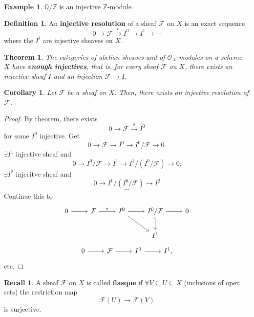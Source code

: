 \documentclass[12pt]{article}
\newtheorem*{theorem}{Theorem}
\newtheorem*{corollary}{Corollary}
\theoremstyle{definition}
\newtheorem*{definition}{Definition}
\newtheorem*{recall}{Recall}
\newtheorem*{example}{Example}
\begin{document}
\begin{example}
$\mathbb{Q}/\mathbb{Z}$ is an injective $\mathbb{Z}$-module.
\end{example}

\begin{definition}
An \textbf{injective resolution} of a sheaf $\mathcal{F}$ on $X$ is an exact sequence
\[0\longrightarrow\mathcal{F}\overset{\epsilon}{\longrightarrow}I^0\longrightarrow I^1\longrightarrow\cdots\]
where the $I^i$ are injective sheaves on $X$.
\end{definition}

\begin{theorem}
The categories of abelian sheaves and of $\mathcal{O}_X$-modules on a scheme $X$ have \textbf{enough injectives}, that is, for every sheaf $\mathcal{F}$ on $X$, there exists an injective sheaf $I$ and an injection $\mathcal{F}\rightarrow I$.
\end{theorem}

\begin{corollary}
Let $\mathcal{F}$ be a sheaf on $X$. Then, there exists an injective resolution of $\mathcal{F}$.
\end{corollary}

\begin{proof}
By theorem, there exists
\[0\longrightarrow\mathcal{F}\overset{\epsilon}{\longrightarrow}I^0\]
for some $I^0$ injective. Get
\[0\longrightarrow\mathcal{F}\longrightarrow I^0\longrightarrow I^0/\mathcal{F}\longrightarrow0.\]
$\exists I^1$ injective sheaf and
\[0\longrightarrow I^0/\mathcal{F}\longrightarrow I^1\longrightarrow I^1/(I^0/\mathcal{F})\longrightarrow0.\]
$\exists I^2$ injecitve sheaf and
\[0\longrightarrow I^1/(I^0/\mathcal{F})\longrightarrow I^2\]
\[\cdots\]
Continue this to
\[
\begin{tikzcd}
0\arrow[r]&\mathcal{F}\arrow[r,"\epsilon"]&I^0\arrow[r]\arrow[rd]&I^0/\mathcal{F}\arrow[r]\arrow[d,hook']&0\\
&&&I^1
\end{tikzcd}
\]
\[
\begin{tikzcd}
0\arrow[r]&\mathcal{F}\arrow[r]&I^0\arrow[r]&I^1,
\end{tikzcd}
\]
etc.
\end{proof}

\begin{recall}
A sheaf $\mathcal{F}$ on $X$ is called \textbf{flasque} if $\forall V\subseteq U\subseteq X$ (inclusions of open sets) the restriction map
\[\mathcal{F}(U)\longrightarrow\mathcal{F}(V)\]
is surjective.
\end{recall}
\end{document}
